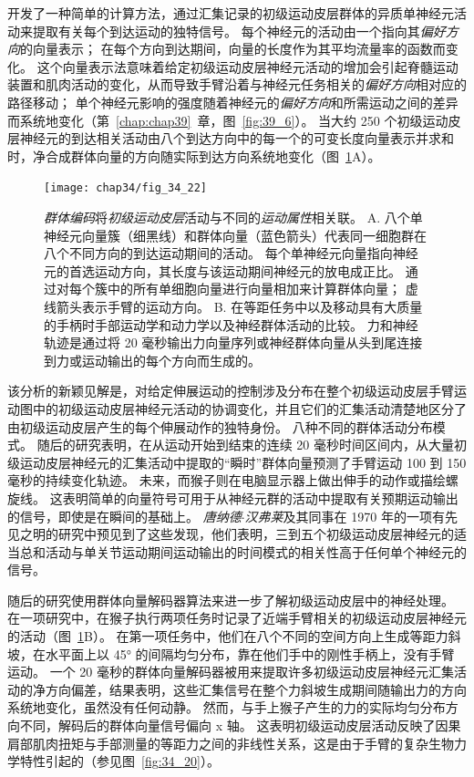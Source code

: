 开发了一种简单的计算方法，通过汇集记录的初级运动皮层群体的异质单神经元活动来提取有关每个到达运动的独特信号。
每个神经元的活动由一个指向其\textit{偏好方向}的向量表示；
在每个方向到达期间，向量的长度作为其平均流量率的函数而变化。
这个向量表示法意味着给定初级运动皮层神经元活动的增加会引起脊髓运动装置和肌肉活动的变化，从而导致手臂沿着与神经元任务相关的\textit{偏好方向}相对应的路径移动；
单个神经元影响的强度随着神经元的\textit{偏好方向}和所需运动之间的差异而系统地变化（第~\ref{chap:chap39}~章，图~\ref{fig:39_6}）。
当大约 250 个初级运动皮层神经元的到达相关活动由八个到达方向中的每一个的可变长度向量表示并求和时，净合成群体向量的方向随实际到达方向系统地变化（图~\ref{fig:34_22}A）。


\begin{figure}[htbp]
	\centering
	\texttt{[image: chap34/fig\_34\_22]}
	\caption{\textit{群体编码}将\textit{初级运动皮层}活动与不同的\textit{运动属性}相关联。
		A. 八个单神经元向量簇（细黑线）和群体向量（蓝色箭头）代表同一细胞群在八个不同方向的到达运动期间的活动。
		每个单神经元向量指向神经元的首选运动方向，其长度与该运动期间神经元的放电成正比。
		通过对每个簇中的所有单细胞向量进行向量相加来计算群体向量；
		虚线箭头表示手臂的运动方向\cite{georgopoulos1983spatial}。
		B. 在等距任务中以及移动具有大质量的手柄时手部运动学和动力学以及神经群体活动的比较。
		力和神经轨迹是通过将 20 毫秒输出力向量序列或神经群体向量从头到尾连接到力或运动输出的每个方向而生成的。}
	\label{fig:34_22}
\end{figure}


该分析的新颖见解是，对给定伸展运动的控制涉及分布在整个初级运动皮层手臂运动图中的初级运动皮层神经元活动的协调变化，并且它们的汇集活动清楚地区分了由初级运动皮层产生的每个伸展动作的独特身份。
八种不同的群体活动分布模式。
随后的研究表明，在从运动开始到结束的连续 20 毫秒时间区间内，从大量初级运动皮层神经元的汇集活动中提取的“瞬时”群体向量预测了手臂运动 100 到 150 毫秒的持续变化轨迹。
未来，而猴子则在电脑显示器上做出伸手的动作或描绘螺旋线。
这表明简单的向量符号可用于从神经元群的活动中提取有关预期运动输出的信号，即使是在瞬间的基础上。
\textit{唐纳德$\cdot$汉弗莱}及其同事在 1970 年的一项有先见之明的研究中预见到了这些发现，他们表明，三到五个初级运动皮层神经元的适当总和活动与单关节运动期间运动输出的时间模式的相关性高于任何单个神经元的信号。


随后的研究使用群体向量解码器算法来进一步了解初级运动皮层中的神经处理。
在一项研究中，在猴子执行两项任务时记录了近端手臂相关的初级运动皮层神经元的活动（图~\ref{fig:34_22}B）。
在第一项任务中，他们在八个不同的空间方向上生成等距力斜坡，在水平面上以 45° 的间隔均匀分布，靠在他们手中的刚性手柄上，没有手臂运动。
一个 20 毫秒的群体向量解码器被用来提取许多初级运动皮层神经元汇集活动的净方向偏差，结果表明，这些汇集信号在整个力斜坡生成期间随输出力的方向系统地变化，虽然没有任何动静。
然而，与手上猴子产生的力的实际均匀分布方向不同，解码后的群体向量信号偏向 x 轴。
这表明初级运动皮层活动反映了因果肩部肌肉扭矩与手部测量的等距力之间的非线性关系，这是由于手臂的复杂生物力学特性引起的（参见图~\ref{fig:34_20}）。


